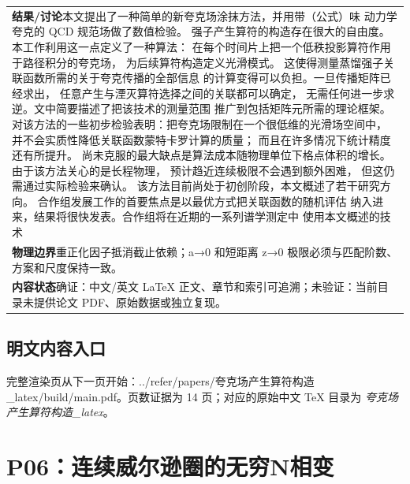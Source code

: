 \documentclass[UTF8,11pt,oneside]{ctexbook}
\begin{document}
\begin{table}[htbp]
\begin{tabular}{@{}p{}@{}}
    \textbf{结果/讨论}\quad 本文提出了一种简单的新夸克场涂抹方法，并用带（公式）味 动力学夸克的 QCD 规范场做了数值检验。 强子产生算符的构造存在很大的自由度。 本工作利用这一点定义了一种算法： 在每个时间片上把一个低秩投影算符作用于路径积分的夸克场， 为后续算符构造定义光滑模式。 这使得测量蒸馏强子关联函数所需的关于夸克传播的全部信息 的计算变得可以负担。一旦传播矩阵已经求出， 任意产生与湮灭算符选择之间的关联都可以确定， 无需任何进一步求逆。文中简要描述了把该技术的测量范围 推广到包括矩阵元所需的理论框架。 对该方法的一些初步检验表明：把夸克场限制在一个很低维的光滑场空间中， 并不会实质性降低关联函数蒙特卡罗计算的质量； 而且在许多情况下统计精度还有所提升。 尚未克服的最大缺点是算法成本随物理单位下格点体积的增长。 由于该方法关心的是长程物理， 预计趋近连续极限不会遇到额外困难， 但这仍需通过实际检验来确认。 该方法目前尚处于初创阶段，本文概述了若干研究方向。 合作组发展工作的首要焦点是以最优方式把关联函数的随机评估 纳入进来，结果将很快发表。合作组将在近期的一系列谱学测定中 使用本文概述的技术 \\
    \textbf{物理边界}\quad 重正化因子抵消截止依赖；a→0 和短距离 z→0 极限必须与匹配阶数、方案和尺度保持一致。 \\
    \textbf{内容状态}\quad 确证：中文/英文 LaTeX 正文、章节和索引可追溯；未验证：当前目录未提供论文 PDF、原始数据或独立复现。 \\
    \bottomrule
  \end{tabular}
\end{table}
\section*{明文内容入口}
\noindent 完整渲染页从下一页开始：../\allowbreak{}refer/\allowbreak{}papers/\allowbreak{}夸克场产生算符构造\_\allowbreak{}latex/\allowbreak{}build/\allowbreak{}main.pdf。页数证据为 14 页；对应的原始中文 TeX 目录为 \emph{夸克场产生算符构造\_latex}。
\clearpage

\clearpage

\chapter{P06：连续威尔逊圈的无穷N相变}
\end{document}
